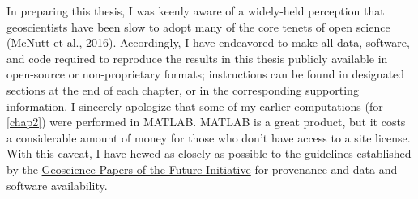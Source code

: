 In preparing this thesis, I was keenly aware of a widely-held perception that geoscientists have been slow to adopt many of the core tenets of open science (McNutt et al., 2016). Accordingly, I have endeavored to make all data, software, and code required to reproduce the results in this thesis publicly available in open-source or non-proprietary formats; instructions can be found in designated sections at the end of each chapter, or in the corresponding supporting information. I sincerely apologize that some of my earlier computations (for \autoref{chap2}) were performed in MATLAB. MATLAB is a great product, but it costs a considerable amount of money for those who don't have access to a site license. With this caveat, I have hewed as closely as possible to the guidelines established by the \href{http://www.scientificpaperofthefuture.org/gpf/what-is-a-gpf}{Geoscience Papers of the Future Initiative} for provenance and data and software availability.
\clearpage
